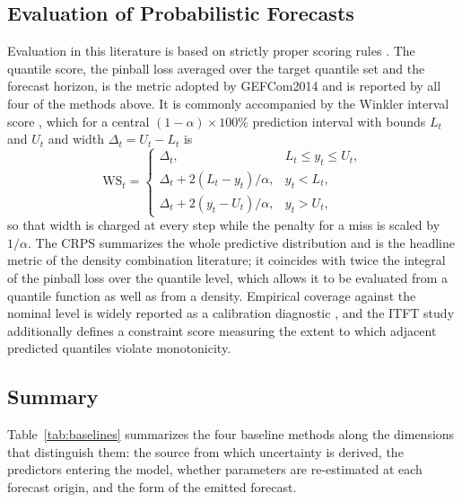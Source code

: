 \documentclass[10pt,journal,compsoc]{IEEEtran}
\begin{document}
\subsection{Evaluation of Probabilistic Forecasts}
Evaluation in this literature is based on strictly proper scoring rules
\cite{gneiting2007strictly}. The quantile score, the pinball loss averaged over the target
quantile set and the forecast horizon, is the metric adopted by GEFCom2014
\cite{hong2016gefcom} and is reported by all four of the methods above. It is commonly
accompanied by the Winkler interval score \cite{winkler1972decision}, which for a central
$(1-\alpha)\times 100\%$ prediction interval with bounds $L_t$ and $U_t$ and width
$\Delta_t = U_t - L_t$ is
\begin{equation}
\mathrm{WS}_t =
\begin{cases}
\Delta_t, & L_t \le y_t \le U_t,\\
\Delta_t + 2(L_t - y_t)/\alpha, & y_t < L_t,\\
\Delta_t + 2(y_t - U_t)/\alpha, & y_t > U_t,
\end{cases}
\end{equation}
so that width is charged at every step while the penalty for a miss is scaled by $1/\alpha$.
The CRPS \cite{gneiting2007strictly} summarizes the whole predictive distribution and is the
headline metric of the density combination literature; it coincides with twice the integral
of the pinball loss over the quantile level, which allows it to be evaluated from a quantile
function as well as from a density. Empirical coverage against the nominal level is widely
reported as a calibration diagnostic \cite{nowotarski2018recent}, and the ITFT study
\cite{li2023probabilistic} additionally defines a constraint score measuring the extent to
which adjacent predicted quantiles violate monotonicity.

\subsection{Summary}
Table~\ref{tab:baselines} summarizes the four baseline methods along the dimensions that
distinguish them: the source from which uncertainty is derived, the predictors entering the
model, whether parameters are re-estimated at each forecast origin, and the form of the
emitted forecast.

\end{document}
